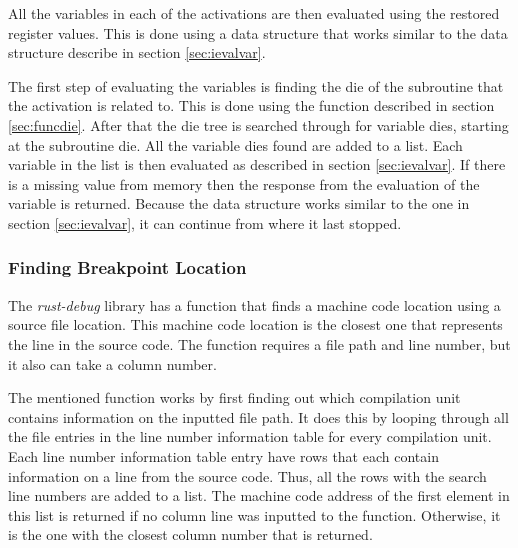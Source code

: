 All the variables in each of the activations are then evaluated using the restored register values.
This is done using a data structure that works similar to the data structure describe in section \ref{sec:ievalvar}.

The first step of evaluating the variables is finding the \gls{die} of the subroutine that the activation is related to.
This is done using the function described in section \ref{sec:funcdie}.
After that the \gls{die} tree is searched through for variable \glspl{die}, starting at the subroutine \gls{die}.
All the variable \glspl{die} found are added to a list.
Each variable in the list is then evaluated as described in section \ref{sec:ievalvar}.
If there is a missing value from memory then the response from the evaluation of the variable is returned.
Because the data structure works similar to the one in section \ref{sec:ievalvar}, it can continue from where it last stopped.


\subsubsection{Finding Breakpoint Location}
The \emph{rust-debug} library has a function that finds a machine code location using a source file location.
This machine code location is the closest one that represents the line in the source code.
The function requires a file path and line number, but it also can take a column number.


The mentioned function works by first finding out which compilation unit contains information on the inputted file path.
It does this by looping through all the file entries in the line number information table for every compilation unit.
Each line number information table entry have rows that each contain information on a line from the source code.
Thus, all the rows with the search line numbers are added to a list.
The machine code address of the first element in this list is returned if no column line was inputted to the function.
Otherwise, it is the one with the closest column number that is returned.

